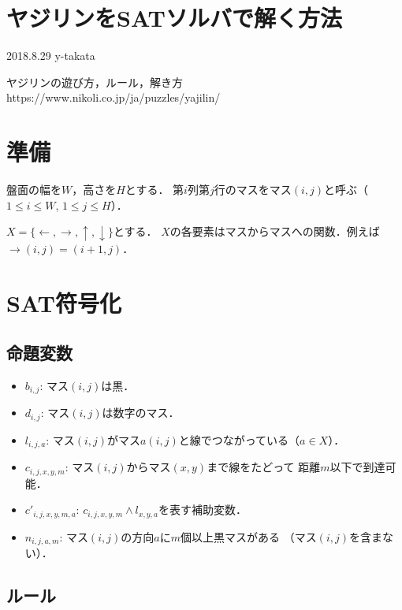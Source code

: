 \documentclass[a4j]{jarticle}
\newcommand{\←}{{\leftarrow}}
\newcommand{\→}{{\rightarrow}}
\newcommand{\↑}{{\uparrow}}
\newcommand{\↓}{{\downarrow}}
\begin{document}
\section*{ヤジリンをSATソルバで解く方法}
\begin{flushright}
2018.8.29 y-takata
\end{flushright}

ヤジリンの遊び方，ルール，解き方\\
https://www.nikoli.co.jp/ja/puzzles/yajilin/

\section{準備}
盤面の幅を$W$，高さを$H$とする．
第$i$列第$j$行のマスをマス$(i,j)$と呼ぶ（$1\le i\le W$, $1\le j\le H$）．

$X=\{\←,\→,\↑,\↓\}$とする．
$X$の各要素はマスからマスへの関数．例えば$\→(i,j)=(i+1,j)$．

\section{SAT符号化}
\subsection{命題変数}
\begin{itemize}
\item $b_{i,j}$: マス$(i,j)$は黒．
\item $d_{i,j}$: マス$(i,j)$は数字のマス．
\item $l_{i,j,a}$: マス$(i,j)$がマス$a(i,j)$と線でつながっている（$a\in X$）．
\item $c_{i,j,x,y,m}$: マス$(i,j)$からマス$(x,y)$まで線をたどって
  距離$m$以下で到達可能．
\item $c'_{i,j,x,y,m,a}$: $c_{i,j,x,y,m}\land l_{x,y,a}$を表す補助変数．
\item $n_{i,j,a,m}$: マス$(i,j)$の方向$a$に$m$個以上黒マスがある
  （マス$(i,j)$を含まない）．
\end{itemize}

\subsection{ルール}
\end{document}
